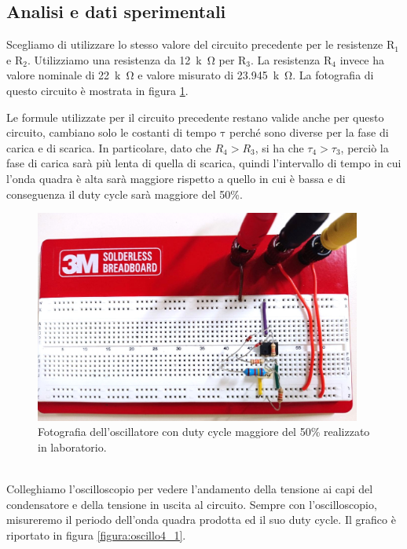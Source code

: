 \documentclass{report}
\begin{document}
\subsection{Analisi e dati sperimentali}
Scegliamo di utilizzare lo stesso valore del circuito precedente per le resistenze $\mathrm{R_1}$ e $\mathrm{R_2}$. Utilizziamo una resistenza da \SI{12}{k\ohm} per $\mathrm{R_3}$. La resistenza $\mathrm{R_4}$ invece ha valore nominale di \SI{22}{k\ohm} e valore misurato di \SI{23.945}{k\ohm}. La fotografia di questo circuito è mostrata in figura \ref{figura:circuito4_1}.\par
Le formule utilizzate per il circuito precedente restano valide anche per questo circuito, cambiano solo le costanti di tempo $\mathrm{\tau}$ perché sono diverse per la fase di carica e di scarica. In particolare, dato che $\displaystyle{R_4>R_3}$, si ha che $\displaystyle{\tau_4>\tau_3}$, perciò la fase di carica sarà più lenta di quella di scarica, quindi l'intervallo di tempo in cui l'onda quadra è alta sarà maggiore rispetto a quello in cui è bassa e di conseguenza il duty cycle sarà maggiore del 50\%.
\begin{figure}[h!]
	\centering
	\includegraphics[height=7cm]{immagini/circuito4_1.jpg}
	\caption{Fotografia dell'oscillatore con duty cycle maggiore del 50\% realizzato in laboratorio.}
	\label{figura:circuito4_1}
\end{figure}
\\Colleghiamo l'oscilloscopio per vedere l'andamento della tensione ai capi del condensatore e della tensione in uscita al circuito. Sempre con l'oscilloscopio, misureremo il periodo dell'onda quadra prodotta ed il suo duty cycle. Il grafico è riportato in figura \ref{figura:oscillo4_1}.\par
\end{document}

